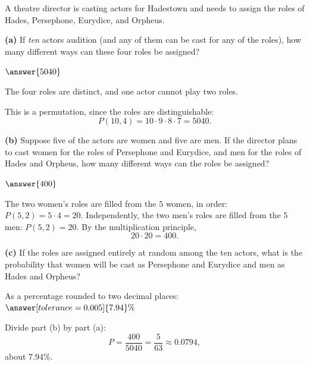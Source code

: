 \documentclass[12pt]{ximera}
\begin{document}
\begin{problem}
A theatre director is casting actors for Hadestown and needs to assign the roles of
Hades, Persephone, Eurydice, and Orpheus.

\begin{prompt}
\textbf{(a)} If \emph{ten} actors audition (and any of them can be cast for any of
the roles), how many different ways can these four roles be assigned?

$\answer{5040}$

\begin{hint}
The four roles are distinct, and one actor cannot play two roles.
\end{hint}

\begin{feedback}
This is a permutation, since the roles are distinguishable:
\[ P(10,4)=10\cdot 9\cdot 8\cdot 7 = 5040. \]
\end{feedback}
\end{prompt}

\begin{prompt}
\textbf{(b)} Suppose five of the actors are women and five are men. If the director
plans to cast women for the roles of Persephone and Eurydice, and men for the roles
of Hades and Orpheus, how many different ways can the roles be assigned?

$\answer{400}$

\begin{feedback}
The two women's roles are filled from the $5$ women, in order:
$P(5,2)=5\cdot 4=20$. Independently, the two men's roles are filled from the $5$ men:
$P(5,2)=20$. By the multiplication principle,
\[ 20 \cdot 20 = 400. \]
\end{feedback}
\end{prompt}

\begin{prompt}
\textbf{(c)} If the roles are assigned entirely at random among the ten actors, what
is the probability that women will be cast as Persephone and Eurydice and men as
Hades and Orpheus?

As a percentage rounded to two decimal places: $\answer[tolerance=0.005]{7.94}\%$

\begin{feedback}
Divide part (b) by part (a):
\[
P = \frac{400}{5040} = \frac{5}{63} \approx 0.0794,
\]
about $7.94\%$.
\end{feedback}
\end{prompt}
\end{problem}
\end{document}
